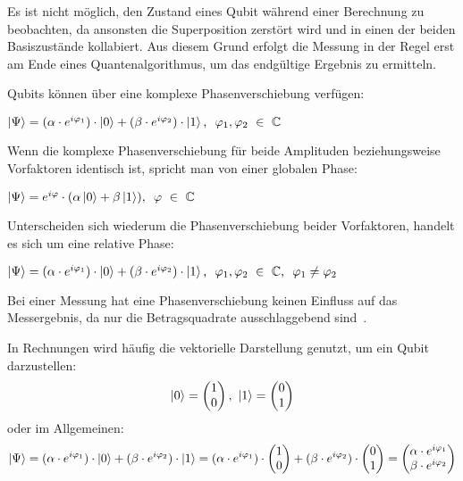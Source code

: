 Es ist nicht möglich, 
den Zustand eines Qubit während einer Berechnung zu beobachten,
da ansonsten die Superposition zerstört wird und in einen der beiden Basiszustände kollabiert.
Aus diesem Grund erfolgt die Messung in der Regel erst am Ende eines Quantenalgorithmus, um das endgültige Ergebnis zu ermitteln.

\vspace{1em}

Qubits können über eine komplexe Phasenverschiebung verfügen:
\begin{center}
  \(
    \ket{\Psi} = (\alpha \cdot e^{i\varphi_1}) \cdot \ket{0} + (\beta \cdot e^{i\varphi_2}) \cdot \ket{1}
    \text{, }~
    \varphi_1,\varphi_2~\in~\mathbb{C}
  \)
  \end{center}
Wenn die komplexe Phasenverschiebung für beide Amplituden beziehungsweise Vorfaktoren identisch ist, 
spricht man von einer globalen Phase:
\begin{center}
  \(
    \ket{\Psi} = e^{i\varphi} \cdot (\alpha \ket{0} + \beta  \ket{1} )
    \text{, }~
    \varphi~\in~\mathbb{C}
  \)
\end{center}
Unterscheiden sich wiederum die Phasenverschiebung beider Vorfaktoren, 
handelt es sich um eine relative Phase:
\begin{center}
  \(
    \ket{\Psi} = (\alpha \cdot e^{i\varphi_1}) \cdot \ket{0} + (\beta \cdot e^{i\varphi_2}) \cdot \ket{1}
    \text{, }~
    \varphi_1,\varphi_2~\in~\mathbb{C}
    \text{, }~
    \varphi_1 \neq \varphi_2
  \)
\end{center}
Bei einer Messung hat eine Phasenverschiebung keinen Einfluss auf das Messergebnis, 
da nur die Betragsquadrate ausschlaggebend sind~\cite{Hoever2023QC}. 

\vspace{1em}
In Rechnungen wird häufig die vektorielle Darstellung genutzt, 
um ein Qubit darzustellen:
\[
  \ket{0} = 
  \begin{pmatrix}
    1 \\
    0
  \end{pmatrix},~ 
  \ket{1} = 
  \begin{pmatrix}
    0 \\
    1
  \end{pmatrix}
  \]
oder im Allgemeinen:
\[
  \ket{\Psi} 
  =
  (\alpha \cdot e^{i\varphi_1}) \cdot \ket{0} + (\beta \cdot e^{i\varphi_2}) \cdot \ket{1}
  =  
  (\alpha \cdot e^{i\varphi_1}) \cdot 
  \begin{pmatrix}
    1 \\
    0
  \end{pmatrix} + (\beta \cdot e^{i\varphi_2}) \cdot 
  \begin{pmatrix}
    0 \\
    1
  \end{pmatrix} 
  =
  \begin{pmatrix}
    \alpha \cdot e^{i\varphi_1} \\
    \beta \cdot e^{i\varphi_2}
  \end{pmatrix}
\] 

